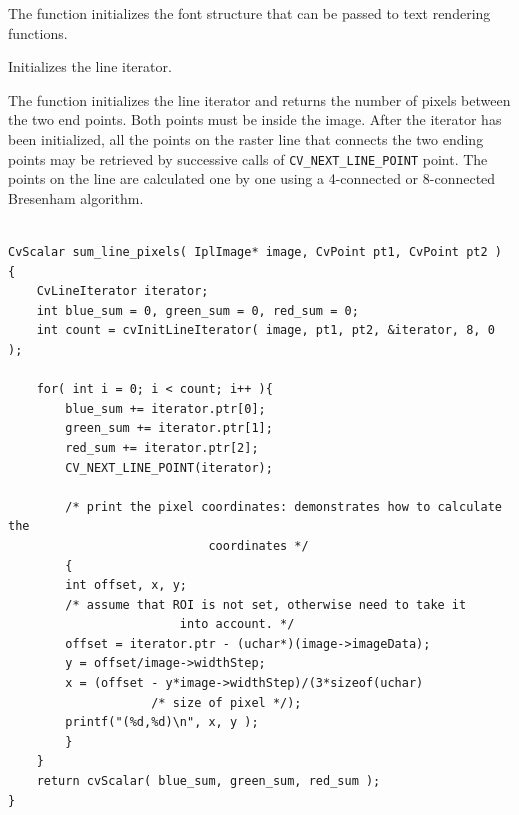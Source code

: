 The function initializes the font structure that can be passed to text rendering functions.


Initializes the line iterator.


\begin{description}
\end{description}

The function initializes the line
iterator and returns the number of pixels between the two end points.
Both points must be inside the image. After the iterator has been
initialized, all the points on the raster line that connects the
two ending points may be retrieved by successive calls of
\texttt{CV\_NEXT\_LINE\_POINT} point. The points on the line are
calculated one by one using a 4-connected or 8-connected Bresenham
algorithm.

\ifC
{}

\begin{lstlisting}

CvScalar sum_line_pixels( IplImage* image, CvPoint pt1, CvPoint pt2 )
{
    CvLineIterator iterator;
    int blue_sum = 0, green_sum = 0, red_sum = 0;
    int count = cvInitLineIterator( image, pt1, pt2, &iterator, 8, 0 );

    for( int i = 0; i < count; i++ ){
        blue_sum += iterator.ptr[0];
        green_sum += iterator.ptr[1];
        red_sum += iterator.ptr[2];
        CV_NEXT_LINE_POINT(iterator);

        /* print the pixel coordinates: demonstrates how to calculate the 
							coordinates */
        {
        int offset, x, y;
        /* assume that ROI is not set, otherwise need to take it 
						into account. */
        offset = iterator.ptr - (uchar*)(image->imageData);
        y = offset/image->widthStep;
        x = (offset - y*image->widthStep)/(3*sizeof(uchar) 
					/* size of pixel */);
        printf("(%d,%d)\n", x, y );
        }
    }
    return cvScalar( blue_sum, green_sum, red_sum );
}

\end{lstlisting}
\fi

